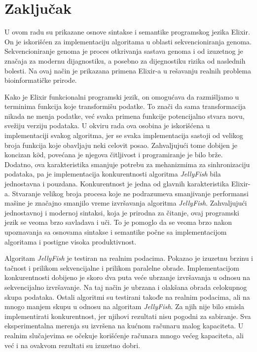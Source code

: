\documentclass[12pt,oneside]{memoir}
\begin{document}
% 

\chapter{Zaključak}
\label{poglavlje:Zaključak}

U ovom radu su prikazane osnove sintakse i semantike programskog jezika Elixir. On je iskorišćen za implementaciju algoritama u oblasti sekvencioniranja genoma. Sekvencioniranje genoma je proces otkrivanja sastava genoma i od izuzetnog je značaja za modernu dijagnostiku, a posebno za dijegnostiku rizika od naslednih bolesti. Na ovaj način je prikazana primena Elixir-a u rešavanju realnih problema bioinformatičke prirode.

Kako je Elixir funkcionalni programski jezik, on omogućava da razmišljamo u terminima funkcija koje transformišu podatke. To znači da sama transformacija nikada ne menja podatke, već svaka primena funkcije potencijalno stvara novu, svežiju verziju podataka. U okviru rada ova osobina je iskorišćena u implementaciji svakog algoritma, jer se svaka implementacija sastoji od velikog broja funkcija koje obavljaju neki celovit posao.  Zahvaljujući tome dobijen je koncizan k$\hat{o}$d, povećana je njegova čitljivost i programiranje je bilo brže. Dodatno, ova karakteristika smanjuje potrebu za mehanizmima za sinhronizaciju podataka, pa je implementacija konkurentnosti algoritma \textit{JellyFish} bila jednostavna i pouzdana. Konkurentnost je jedna od glavnih karakteristika Elixir-a. Stvaranje velikog broja procesa koje ne podrazumeva smanjivanje performansi mašine je značajno smanjilo vreme izvršavanja algoritma \textit{JellyFish}. Zahvaljujući jednostavnoj i modernoj sintaksi, koja je prirodna za čitanje, ovaj programski jezik se veoma brzo savladava i uči. To je pomoglo da se veoma brzo nakon upoznavanja sa osnovama sintakse i semantike počne sa implementacijom algoritama i postigne visoka produktivnost.

Algoritam \textit{JellyFish} je testiran na realnim podacima. Pokazao je izuzetnu brzinu i tačnost i prilikom sekvencijalne i prilikom paralelne obrade. Implementacijom konkurentnosti dobijeno je skoro dva puta veće ubrzanje izvršavanja u odnosu na sekvencijalno izvršavanje. Na taj način je ubrzana i olakšana obrada celokupnog skupa podataka. Ostali algoritmi su testirani takođe na realnim podacima, ali na mnogo manjem skupu u odnosu na algoritam \textit{JellyFish}. Za njih nije bilo smisla implementirati konkurentnost, jer njihovi rezultati nisu pogodni za sabiranje. Sva eksperimentalna merenja su izvršena na kućnom računaru malog kapaciteta. U realnim slučajevima se očekuje korišćenje računara mnogo većeg kapaciteta, ali već i na ovakvom rezultati su izuzetno dobri.
\end{document}
